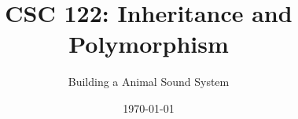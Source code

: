 
\title{CSC 122: Inheritance and Polymorphism}
\author{Building a Animal Sound System}
\date{\today}
